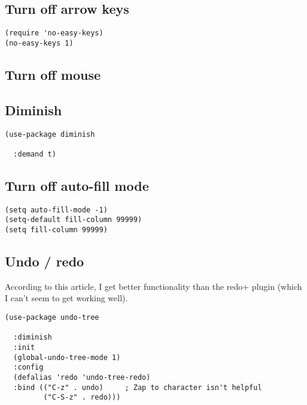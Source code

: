 \documentclass[12pt]{article}
\begin{document}
\subsection{Turn off arrow keys}
\label{sec:org1d35e82}

\begin{verbatim}
(require 'no-easy-keys)
(no-easy-keys 1)
\end{verbatim}

\subsection{Turn off  mouse}
\label{sec:orga87f215}

\subsection{Diminish}
\label{sec:org6f4cbfa}

\begin{verbatim}
(use-package diminish 

  :demand t)
\end{verbatim}

\subsection{Turn off auto-fill mode}
\label{sec:org58e490c}

\begin{verbatim}
(setq auto-fill-mode -1)
(setq-default fill-column 99999)
(setq fill-column 99999)
\end{verbatim}

\subsection{Undo / redo}
\label{sec:org6e5305a}
According to this article, I get better functionality than the redo+ plugin (which I can’t seem to get working well).
\begin{verbatim}
(use-package undo-tree

  :diminish
  :init
  (global-undo-tree-mode 1)
  :config
  (defalias 'redo 'undo-tree-redo)
  :bind (("C-z" . undo)     ; Zap to character isn't helpful
         ("C-S-z" . redo)))

\end{verbatim}
\end{document}
